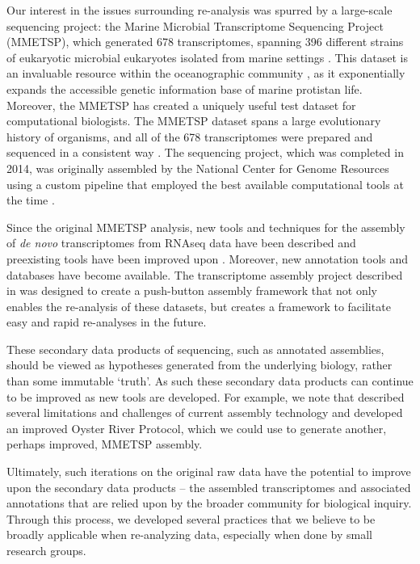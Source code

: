 \documentclass[a4paper,num-refs]{oup-contemporary}
\begin{document}

Our interest in the issues surrounding re-analysis was spurred by a large-scale sequencing project: the Marine Microbial Transcriptome Sequencing Project (MMETSP), which generated 678 transcriptomes, spanning 396 different strains of eukaryotic microbial eukaryotes isolated from marine settings \cite{Caron2016}. This dataset is an invaluable resource within the oceanographic community \cite{Keeling2014, Caron2016}, as it exponentially expands the accessible genetic information base of marine protistan life. Moreover, the MMETSP has created a uniquely useful test dataset for computational biologists. The MMETSP dataset spans a large evolutionary history of organisms, and all of the 678 transcriptomes were prepared and sequenced in a consistent way \cite{Keeling2014}. The sequencing project, which was completed in 2014, was originally assembled by the National Center for Genome Resources using a custom pipeline that employed the best available computational tools at the time \cite{Simpson2009, Huang1999}.

Since the original MMETSP analysis, new tools and techniques for the assembly of {\em de novo} transcriptomes from RNAseq data have been described and preexisting tools have been improved upon \cite{Grabherr2011}. Moreover, new annotation tools and databases have become available. The transcriptome assembly project described in \citet{Johnson2018} was designed to create a push-button assembly framework that not only enables the re-analysis of these datasets, but creates a framework to facilitate easy and rapid re-analyses in the future.

These secondary data products of sequencing, such as annotated
assemblies, should be viewed as hypotheses generated from the
underlying biology, rather than some immutable `truth'. As such these
secondary data products can continue to be improved as new tools are
developed.  For example, we note that \citet{MacManes177253} described several
limitations and challenges of current assembly technology and developed
an improved Oyster River Protocol, which we could use to generate another,
perhaps improved, MMETSP assembly.

Ultimately, such iterations on the original raw data have the
potential to improve upon the secondary data products -- the assembled
transcriptomes and associated annotations that are relied upon by the
broader community for biological inquiry. Through this process, we developed several
practices that we believe to be broadly applicable when re-analyzing data,
especially when done by small research groups.
\end{document}

